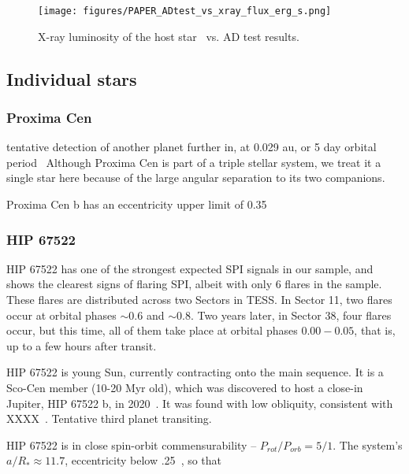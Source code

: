 \documentclass[twocolumn]{aastex631}
\begin{document}
\begin{figure*}[ht!]
    \begin{centering}
        \texttt{[image: figures/PAPER\_ADtest\_vs\_xray\_flux\_erg\_s.png]}
        \caption{X-ray luminosity of the host star~\cite{foster2022identifying} vs. AD test results.
        }
        \label{fig:adtest_xray_flux_erg_s}
    \end{centering}
\end{figure*}

\subsection{Individual stars}

\subsubsection{Proxima Cen}
tentative detection of another planet further in, at 0.029 au, or 5 day orbital period~\citep{faria2022candidate, artigau2022linebyline}
Although Proxima Cen is part of a triple stellar system, we treat it a single star here because of the large angular separation to its two companions.

Proxima Cen b has an eccentricity upper limit of 0.35~\cite{anglada-escude2016terrestrial}

\subsubsection{HIP 67522}
HIP 67522 has one of the strongest expected SPI signals in our sample, and shows the clearest signs of flaring SPI, albeit with only 6 flares in the sample. These flares are distributed across two Sectors in TESS. In Sector 11, two flares occur at orbital phases $\sim 0.6$ and $\sim 0.8$. Two years later, in Sector 38, four flares occur, but this time, all of them take place at orbital phases $0.00-0.05$, that is, up to a few hours after transit.

HIP 67522 is young Sun, currently contracting onto the main sequence. It is a Sco-Cen member (10-20 Myr old), which was discovered to host a close-in Jupiter, HIP 67522 b, in 2020~\citep{rizzuto2020tess}. It was found with low obliquity, consistent with XXXX~\citep{heitzmann2021obliquity}. Tentative third planet transiting.

HIP 67522 is in close spin-orbit commensurability -- $P_{rot}/P_{orb}=5/1$. The system's $a/R_*\approx11.7$, eccentricity below .25~\cite{rizzuto2020tess}, so that  
\end{document}
